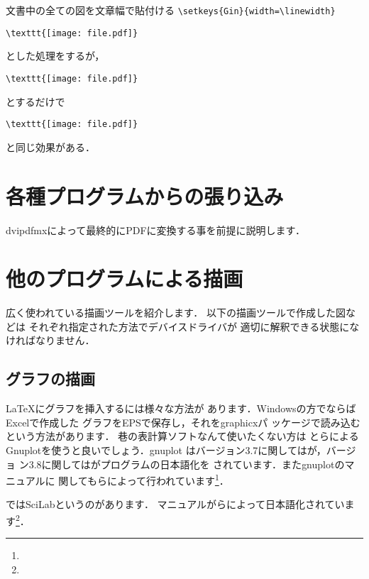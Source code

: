 文書中の全ての図を文章幅で貼付ける
\verb|\setkeys{Gin}{width=\linewidth}|

\verb|\texttt{[image: file.pdf]}|

とした処理をするが，

\verb|\texttt{[image: file.pdf]}|

とするだけで

\verb|\texttt{[image: file.pdf]}|

と同じ効果がある．


\section{各種プログラムからの張り込み}

dvipdfmxによって最終的にPDFに変換する事を前提に説明します．


\section{他のプログラムによる描画}
広く使われている描画ツールを紹介します．
以下の描画ツールで作成した図などは
それぞれ指定された方法でデバイスドライバが
適切に解釈できる状態になければなりません．


\subsection{グラフの描画}
{\LaTeX}にグラフを挿入するには様々な方法が
あります．Windowsの方でならば{Excel}で作成した
グラフをEPSで保存し，それを\textsf{graphicx}パ
ッケージで読み込むという方法があります．
巷の表計算ソフトなんて使いたくない方は
とらによる
{Gnuplot}を使うと良いでしょう．{gnuplot}
はバージョン3.7に関してはが，バージョ
ン3.8に関してはがプログラムの日本語化を
されています．また{gnuplot}のマニュアルに
関してもらによって行われています\footnote{\webGplotman}．

では{SciLab}というのがあります．
マニュアルがらによって日本語化されています\footnote{\webScilabman}．

